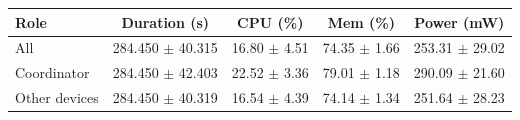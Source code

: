 \begin{tabular}{lcccc}
\hline
\textbf{Role} & \textbf{Duration (s)} & \textbf{CPU (\%)} & \textbf{Mem (\%)} & \textbf{Power (mW)} \\
\hline
All & 284.450 $\pm$ 40.315 & 16.80 $\pm$ 4.51 & 74.35 $\pm$ 1.66 & 253.31 $\pm$ 29.02 \\
Coordinator & 284.450 $\pm$ 42.403 & 22.52 $\pm$ 3.36 & 79.01 $\pm$ 1.18 & 290.09 $\pm$ 21.60 \\
Other devices & 284.450 $\pm$ 40.319 & 16.54 $\pm$ 4.39 & 74.14 $\pm$ 1.34 & 251.64 $\pm$ 28.23 \\
\hline
\end{tabular}
